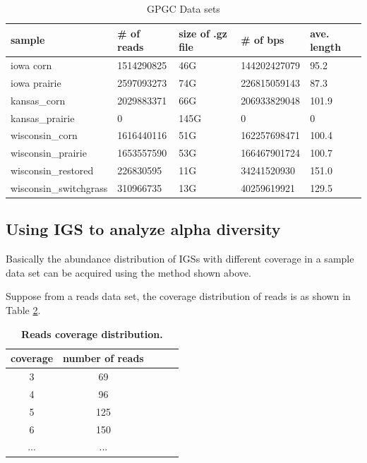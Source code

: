 \documentclass{article}
\begin{document}
\begin{table}[h]
\caption{GPGC Data sets}
\label{my-label}
\begin{tabular}{|l|l|l|l|l|}
\hline
sample & \# of reads & size of .gz file & \# of bps & ave. length \\ \hline
iowa corn & 1514290825 & 46G & 144202427079 & 95.2 \\ \hline
iowa prairie & 2597093273 & 74G & 226815059143 & 87.3 \\ \hline
kansas\_corn & 2029883371 & 66G & 206933829048 & 101.9 \\ \hline
kansas\_prairie & 0 & 145G & 0 & 0 \\ \hline
wisconsin\_corn & 1616440116 & 51G & 162257698471 & 100.4 \\ \hline
wisconsin\_prairie & 1653557590 & 53G & 166467901724 & 100.7 \\ \hline
wisconsin\_restored & 226830595 & 11G & 34241520930 & 151.0 \\ \hline
wisconsin\_switchgrass & 310966735 & 13G & 40259619921 & 129.5 \\ \hline
\end{tabular}
\end{table}


\subsection{Using IGS to analyze alpha diversity}

Basically the abundance distribution of IGSs with different coverage in a 
sample data set can be acquired using the method shown above.

Suppose from a reads data set, the coverage distribution of reads is as 
shown in Table \ref{table:read_coverage}.

\begin{table}[!ht]
\centering
\begin{tabular}{|c|c|c|c|c|}
\hline 
coverage & number of reads \\
\hline 
3                   & 69  \\
4                  & 96  \\
5                  & 125 \\
6                   & 150 \\
...        & ... \\
\hline 
\end{tabular}

\caption{\bf Reads coverage distribution.}
\label{table:read_coverage}
\end{table}
\end{document}
